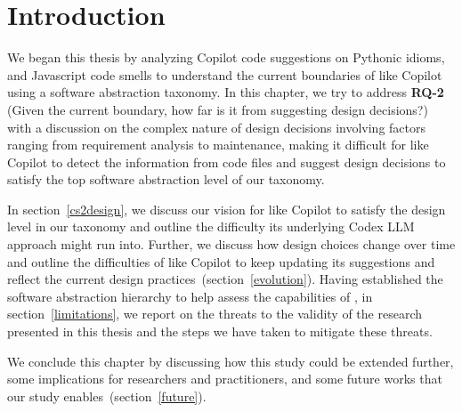 \label{chapter:discussion}

\section{Introduction}
We began this thesis by analyzing Copilot code suggestions on Pythonic idioms, and Javascript code smells to understand the current boundaries of \cct{} like Copilot using a software abstraction taxonomy.
In this chapter, we try to address \textbf{RQ-2} (Given the current boundary, how far is it from suggesting design decisions?) with a discussion on the complex nature of design decisions involving factors ranging from requirement analysis to maintenance, making it difficult for \cct{} like Copilot to detect the information from code files and suggest design decisions to satisfy the top software abstraction level of our taxonomy.

In section~\ref{cs2design}, we discuss our vision for \cct{} like Copilot to satisfy the design level in our taxonomy and outline the difficulty its underlying Codex LLM approach might run into.
Further, we discuss how design choices change over time and outline the difficulties of \cct{} like Copilot to keep updating its suggestions and reflect the current design practices~(section~\ref{evolution}).
Having established the software abstraction hierarchy to help assess the capabilities of \cct{}, in section~\ref{limitations}, we report on the threats to the validity of the research presented in this thesis and the steps we have taken to mitigate these threats.

We conclude this chapter by discussing how this study could be extended further, some implications for researchers and practitioners, and some future works that our study enables~(section~\ref{future}).







